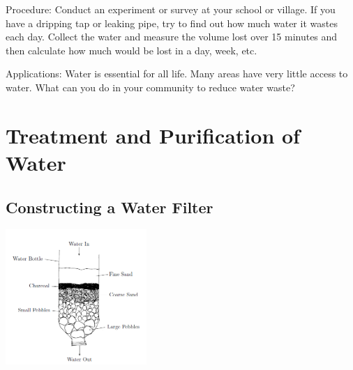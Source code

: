\begin{multicols}{2}
\begin{description*}
\item[Procedure:]{Conduct an experiment or survey at your school or village. If you have a dripping tap or leaking pipe, try to find out how much water it wastes each day. Collect the water and measure the volume lost over 15 minutes and then calculate how much would be lost in a day, week, etc.}
\item[Applications:]{Water is essential for all life. Many areas have very little access to water. What can you do in your community to reduce water waste?}
\end{description*}


\section*{Treatment and Purification of Water}


\subsection{Constructing a Water Filter}

\begin{center}
\includegraphics[width=0.4\textwidth]{./img/water-filter.png}
\end{center}


\end{multicols}
